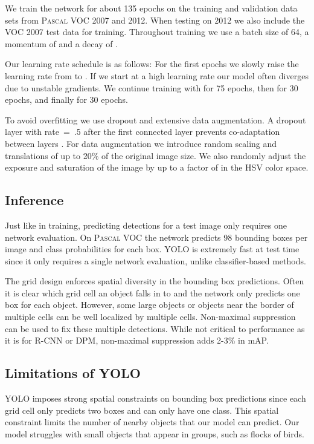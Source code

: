 \documentclass[10pt,twocolumn,letterpaper]{article}
\begin{document}
We train the network for about 135 epochs on the training and validation data sets from \textsc{Pascal} VOC 2007 and 2012. When testing on 2012 we also include the VOC 2007 test data for training. Throughout training we use a batch size of 64, a momentum of  and a decay of .

Our learning rate schedule is as follows: For the first epochs we slowly raise the learning rate from  to . If we start at a high learning rate our model often diverges due to unstable gradients. We continue training with  for 75 epochs, then  for 30 epochs, and finally  for 30 epochs.

To avoid overfitting we use dropout and extensive data augmentation. A dropout layer with rate~=~.5 after the first connected layer prevents co-adaptation between layers \cite{hinton2012improving}. For data augmentation we introduce random scaling and translations of up to 20\% of the original image size. We also randomly adjust the exposure and saturation of the image by up to a factor of  in the HSV color space.

\subsection{Inference}

Just like in training, predicting detections for a test image only requires one network evaluation. On \textsc{Pascal} VOC the network predicts 98 bounding boxes per image and class probabilities for each box. YOLO is extremely fast at test time since it only requires a single network evaluation, unlike classifier-based methods.

The grid design enforces spatial diversity in the bounding box predictions. Often it is clear which grid cell an object falls in to and the network only predicts one box for each object. However, some large objects or objects near the border of multiple cells can be well localized by multiple cells. Non-maximal suppression can be used to fix these multiple detections. While not critical to performance as it is for R-CNN or DPM, non-maximal suppression adds 2-3\% in mAP.

\subsection{Limitations of YOLO}

YOLO imposes strong spatial constraints on bounding box predictions since each grid cell only predicts two boxes and can only have one class. This spatial constraint limits the number of nearby objects that our model can predict. Our model struggles with small objects that appear in groups, such as flocks of birds.
\end{document}
